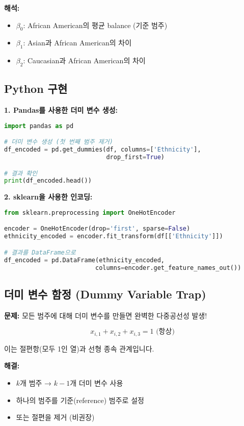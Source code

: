 \documentclass[12pt]{article}
\begin{document}
\textbf{해석:}
\begin{itemize}
    \item $\beta_0$: African American의 평균 balance (기준 범주)
    \item $\beta_1$: Asian과 African American의 차이
    \item $\beta_2$: Caucasian과 African American의 차이
\end{itemize}

\subsection{Python 구현}

\textbf{1. Pandas를 사용한 더미 변수 생성:}
\begin{lstlisting}[language=Python]
import pandas as pd

# 더미 변수 생성 (첫 번째 범주 제거)
df_encoded = pd.get_dummies(df, columns=['Ethnicity'],
                            drop_first=True)

# 결과 확인
print(df_encoded.head())
\end{lstlisting}

\textbf{2. sklearn을 사용한 인코딩:}
\begin{lstlisting}[language=Python]
from sklearn.preprocessing import OneHotEncoder

encoder = OneHotEncoder(drop='first', sparse=False)
ethnicity_encoded = encoder.fit_transform(df[['Ethnicity']])

# 결과를 DataFrame으로
df_encoded = pd.DataFrame(ethnicity_encoded,
                         columns=encoder.get_feature_names_out())
\end{lstlisting}

\subsection{더미 변수 함정 (Dummy Variable Trap)}

\textbf{문제:} 모든 범주에 대해 더미 변수를 만들면 완벽한 다중공선성 발생!

\begin{equation}
x_{i,1} + x_{i,2} + x_{i,3} = 1 \text{ (항상)}
\end{equation}

이는 절편항(모두 1인 열)과 선형 종속 관계입니다.

\textbf{해결:}
\begin{itemize}
    \item $k$개 범주 → $k-1$개 더미 변수 사용
    \item 하나의 범주를 기준(reference) 범주로 설정
    \item 또는 절편을 제거 (비권장)
\end{itemize}
\end{document}
